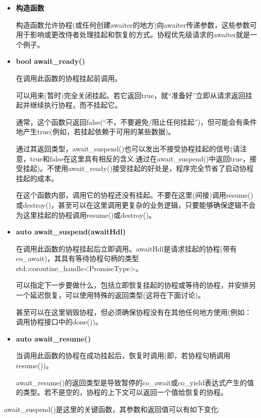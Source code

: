\begin{itemize}
\item
\textbf{构造函数}

构造函数允许协程(或任何创建awaiter的地方)向awaiter传递参数，这些参数可用于影响或更改侍者处理挂起和恢复的方式。协程优先级请求的awaiter就是一个例子。

\item
\textbf{bool await\_ready()}

在调用此函数的协程挂起前调用。

可以用来(暂时)完全关闭挂起。若它返回true，就“准备好”立即从请求返回挂起并继续执行协程，而不挂起它。

通常，这个函数只返回false(“不，不要避免/阻止任何挂起”)，但可能会有条件地产生true(例如，若挂起依赖于可用的某些数据)。

通过其返回类型，await\_suspend()也可以发出不接受协程挂起的信号(请注意，true和false在这里具有相反的含义:通过在await\_suspend()中返回true，接受挂起)。不使用await\_ready()接受挂起的好处是，程序完全节省了启动协程挂起的成本。

在这个函数内部，调用它的协程还没有挂起。不要在这里(间接)调用resume()或destroy()，甚至可以在这里调用更复杂的业务逻辑，只要能够确保逻辑不会为这里挂起的协程调用resume()或destroy()。

\item
\textbf{auto await\_suspend(awaitHdl)}

在调用此函数的协程挂起后立即调用。awaitHdl是请求挂起的协程(带有co\_await)，其具有等待协程句柄的类型std::coroutine\_handle<PromiseType>。

可以指定下一步要做什么，包括立即恢复挂起的协程或等待的协程，并安排另一个延迟恢复，可以使用特殊的返回类型(这将在下面讨论)。

甚至可以在这里销毁协程，但必须确保协程没有在其他任何地方使用(例如：调用协程接口中的done())。

\item
\textbf{auto await\_resume()}

当调用此函数的协程在成功挂起后，恢复时调用(即，若协程句柄调用resume())。

await\_resume()的返回类型是导致暂停的co\_await或co\_yield表达式产生的值的类型。若不是空的，协程的上下文可以返回一个值给恢复的协程。
\end{itemize}

await\_suspend()是这里的关键函数，其参数和返回值可以有如下变化:

